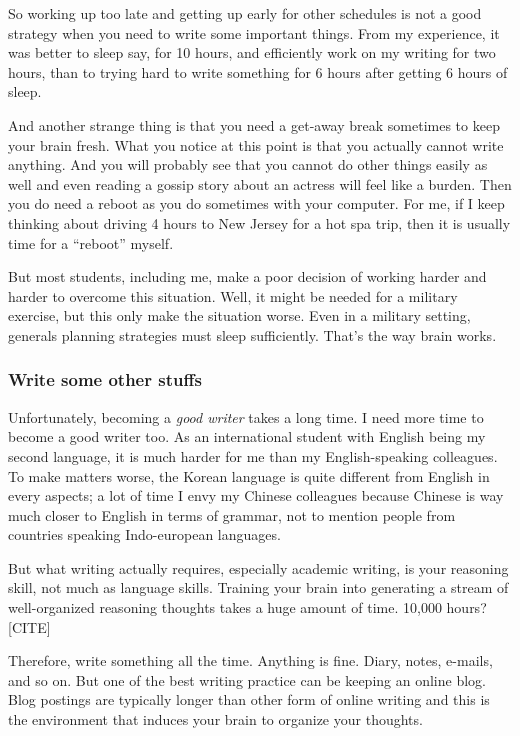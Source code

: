 \documentclass[11pt]{article}
\begin{document}
So working up too late and getting up early for other schedules is not a good
strategy when you need to write some important things. From my experience, it
was better to sleep say, for 10 hours, and efficiently work on my writing for
two hours, than to trying hard to write something for 6 hours after getting 6
hours of sleep. 

And another strange thing is that you need a get-away break sometimes to keep
your brain fresh. What you notice at this point is that you actually cannot
write anything. And you will probably see that you cannot do other things
easily as well and even reading a gossip story about an actress will feel like
a burden. Then you do need a reboot as you do sometimes with your computer.
For me, if I keep thinking about driving 4 hours to New Jersey for a hot spa
trip, then it is usually time for a ``reboot'' myself. 

But most students, including me, make a poor decision of working harder and
harder to overcome this situation. Well, it might be needed for a military
exercise, but this only make the situation worse. Even in a military setting,
generals planning strategies must sleep sufficiently. That's the way brain
works. 


\subsubsection{Write some other stuffs}
Unfortunately, becoming a \emph{good writer} takes a long time. I need more
time to become a good writer too. As an international student with English
being my second language, it is much harder for me than my English-speaking
colleagues. To make matters worse, the Korean language is quite different from
English in every aspects; a lot of time I envy my Chinese colleagues because
Chinese is way much closer to English in terms of grammar, not to mention
people from countries speaking Indo-european languages.

But what writing actually requires, especially academic writing, is your
reasoning skill, not much as language skills. Training your brain into
generating a stream of well-organized reasoning thoughts takes a huge amount
of time. 10,000 hours? [CITE]

Therefore, write something all the time. Anything is fine. Diary, notes,
e-mails, and so on. But one of the best writing practice can be keeping an
online blog. Blog postings are typically longer than other form of online
writing and this is the environment that induces your brain to organize your
thoughts. 
\end{document}
